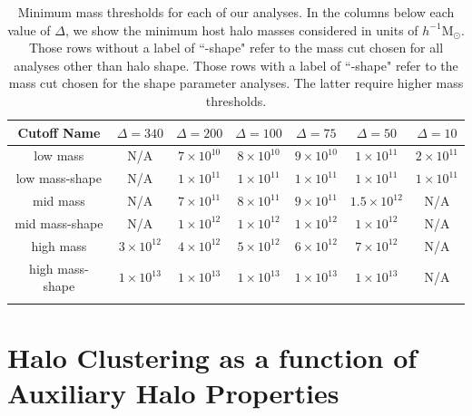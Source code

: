 \documentclass[usenatbib]{mnras}
\begin{document}
\begin{table}
\caption{
Minimum mass thresholds for each of our analyses. 
In the columns below each value of $\Delta$, we show the minimum 
host halo masses considered in units of $h^{-1}\mathrm{M}_{\odot}$.
Those rows without a label of ``-shape" refer to the mass cut chosen for 
all analyses other than halo shape. Those rows with a label of ``-shape" refer to 
the mass cut chosen for the shape parameter analyses. The latter require higher mass thresholds.}
\vspace*{8pt}
\begin{tabular}{ c c c c c c c }
\hline
\hline
Cutoff Name &  $\Delta=340$ & $\Delta=200$ & $\Delta=100$ & $\Delta=75$ & $\Delta=50$ & $\Delta=10$ \\
\hline
\vspace*{2pt}
{low mass} & {N/A} & $7 \times 10^{10}$ & $8 \times 10^{10}$ & $9 \times 10^{10}$ & $1 \times 10^{11}$ & $2 \times 10^{11}$  \\ \vspace*{4pt}
{low mass-shape} & {N/A} & $1 \times 10^{11}$ & $1 \times 10^{11}$ & $1 \times 10^{11}$ & $1 \times 10^{11}$ & $1 \times 10^{11}$ \\
{mid mass} & {N/A} & $7 \times 10^{11}$ & $8 \times 10^{11}$ & $9 \times 10^{11}$ & $1.5 \times 10^{12}$ & {N/A} \\ \vspace*{4pt}
{mid mass-shape} & {N/A} & $1 \times 10^{12}$ & $1 \times 10^{12}$ & $1 \times 10^{12}$ & $1 \times 10^{12}$ & {N/A} \\
{high mass} & $3 \times 10^{12}$ & $4 \times 10^{12}$ & $5 \times 10^{12}$ & $6 \times 10^{12}$ & $7 \times 10^{12}$ & {N/A} \\ \vspace*{2pt}
{high mass-shape} & $1 \times 10^{13}$ & $1 \times 10^{13}$ & $1 \times 10^{13}$ & $1 \times 10^{13}$ & $1 \times 10^{13}$ & {N/A} \\
\hline
\hline \\
\end{tabular}
\label{table:thresholds}
\end{table}



\section[]{Halo Clustering as a function of Auxiliary Halo Properties}
\label{section:methodology}
\end{document}
